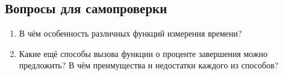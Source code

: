 \subsection{Вопросы для самопроверки}
\begin{enumerate}
    \item В чём особенность различных функций измерения времени?
    \item Какие ещё способы вызова функции о проценте завершения можно предложить? В чём преимущества и недостатки каждого из способов?
\end{enumerate}
